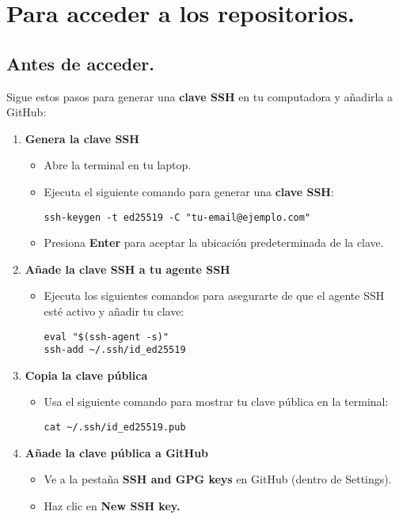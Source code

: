 \documentclass[10pt,a4paper]{book}
\begin{document}
\chapter{Para acceder a los repositorios.}
\section{Antes de acceder.}
Sigue estos pasos para generar una \textbf{clave SSH} en tu computadora y añadirla a GitHub:
\begin{enumerate}
	\item \textbf{Genera la clave SSH}
	\begin{itemize}
		\item Abre la terminal en tu laptop.

		\item Ejecuta el siguiente comando para generar una \textbf{clave SSH}: 
		\begin{lstlisting}
ssh-keygen -t ed25519 -C "tu-email@ejemplo.com"
		\end{lstlisting}
		
		\item Presiona \textbf{Enter} para aceptar la ubicación predeterminada de la clave.
	\end{itemize}
	\item \textbf{Añade la clave SSH a tu agente SSH}
	\begin{itemize}
		\item Ejecuta los siguientes comandos para asegurarte de que el agente SSH esté activo y añadir tu clave:
		\begin{lstlisting}
eval "$(ssh-agent -s)"
ssh-add ~/.ssh/id_ed25519
		\end{lstlisting}
	\end{itemize}
	\item \textbf{Copia la clave pública}
	\begin{itemize}
		\item Usa el siguiente comando para mostrar tu clave pública en la terminal:
		\begin{lstlisting}
cat ~/.ssh/id_ed25519.pub
		\end{lstlisting}
	\end{itemize}
	\item \textbf{Añade la clave pública a GitHub}
	\begin{itemize}
		\item Ve a la pestaña \textbf{SSH and GPG keys} en GitHub (dentro de Settings).

		\item Haz clic en \textbf{New SSH key.}


\end{itemize}
\end{enumerate}
\end{document}
